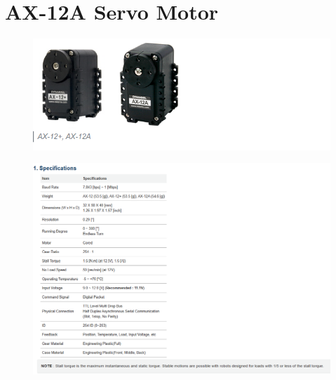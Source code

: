 \section*{AX-12A Servo Motor}

\begin{figure}[H]
	\centering
	\includegraphics[width=1\textwidth]{Figures/Appendecis/ax-12a-1}
\end{figure}

\begin{figure}[H]
	\centering
	\includegraphics[width=1\textwidth]{Figures/Appendecis/ax-12a-2}
\end{figure}